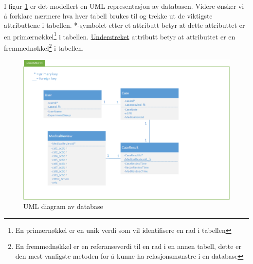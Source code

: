 I figur \ref{fig:umldiagramdatabase} er det modellert en UML representasjon av databasen. Videre ønsker vi å forklare nærmere hva hver tabell brukes til og trekke ut de viktigste attributtene i tabellen. *-symbolet etter et attributt betyr at dette attributtet er en primærnøkkel\footnote{En primærnøkkel er en unik verdi som vil identifisere en rad i tabellen} i tabellen. \underline{Understreket} attributt betyr at attributtet er en fremmednøkkel\footnote{ En fremmednøkkel er en referanseverdi til en rad i en annen tabell, dette er den mest vanligste metoden for å kunne ha relasjonsmønstre i en database} i tabellen.
\begin{figure}[H]
\centering
\includegraphics[width=16cm]{images/UMLDiagramDatabase.png}
\caption{UML diagram av database}
\label{fig:umldiagramdatabase}
\end{figure}
\label{chap:db}

